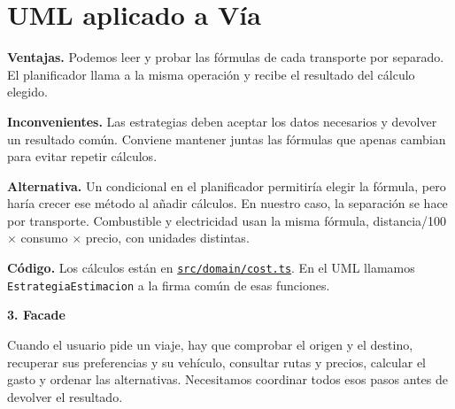 \documentclass[10pt,a4paper]{article}
\newcommand{\titulo}[2]{{\LARGE\bfseries #1. #2}\par}
\newcommand{\apartado}[1]{\section*{\large #1}}
\newcommand{\fuente}[2]{\href{https://github.com/Kiliansito/ei1039-ei1048-movilidad/blob/dce2b57/entrega1/02_Spike/#1}{\texttt{\small #2}}}
\begin{document}
\apartado{UML aplicado a Vía}
\begin{center}\end{center}

\textbf{Ventajas.} Podemos leer y probar las fórmulas de cada transporte por separado. El planificador llama a la misma operación y recibe el resultado del cálculo elegido.

\textbf{Inconvenientes.} Las estrategias deben aceptar los datos necesarios y devolver un resultado común. Conviene mantener juntas las fórmulas que apenas cambian para evitar repetir cálculos.

\textbf{Alternativa.} Un condicional en el planificador permitiría elegir la fórmula, pero haría crecer ese método al añadir cálculos. En nuestro caso, la separación se hace por transporte. Combustible y electricidad usan la misma fórmula, distancia/100 $\times$ consumo $\times$ precio, con unidades distintas.

\textbf{Código.} Los cálculos están en \fuente{src/domain/cost.ts}{src/domain/cost.ts}. En el UML llamamos \texttt{EstrategiaEstimacion} a la firma común de esas funciones.

\newpage
\titulo{3}{Facade}
Cuando el usuario pide un viaje, hay que comprobar el origen y el destino, recuperar sus preferencias y su vehículo, consultar rutas y precios, calcular el gasto y ordenar las alternativas. Necesitamos coordinar todos esos pasos antes de devolver el resultado.
\end{document}
